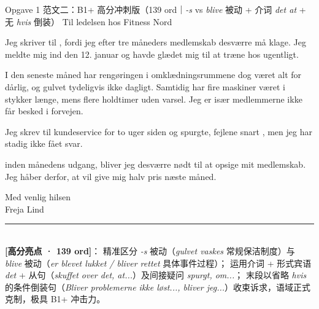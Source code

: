 \begin{emailbox}{Opgave 1 范文二：B1+ 高分冲刺版（139 ord｜\textit{-s} vs \textit{blive} 被动 + 介词 \textit{det at} + 无 \textit{hvis} 倒装）}
Til ledelsen hos Fitness Nord

\vspace{0.25em}
Jeg skriver til , fordi jeg efter tre måneders medlemskab desværre må klage. Jeg meldte mig ind den 12. januar og havde glædet mig til at træne hos  ugentligt.

\vspace{0.25em}
I den seneste måned har rengøringen i omklædningsrummene dog været alt for dårlig, og gulvet  tydeligvis ikke dagligt. Samtidig har fire maskiner været i stykker længe, mens flere holdtimer  uden varsel. Jeg er især  medlemmerne ikke får besked i forvejen.

\vspace{0.25em}
Jeg skrev til  kundeservice for to uger siden og spurgte,  fejlene snart , men jeg har stadig ikke fået svar.

\vspace{0.25em}
 inden månedens udgang, bliver jeg desværre nødt til at opsige mit medlemskab. Jeg håber derfor, at  vil give mig halv pris næste måned.

\vspace{0.25em}
Med venlig hilsen\\
Freja Lind

\vspace{0.3em}
\rule{\linewidth}{0.4pt}\\[0.2em]
\small\textbf{\color{NCDNavy}[高分亮点 · 139 ord]}： 精准区分 \textit{-s} 被动（\textit{gulvet vaskes} 常规保洁制度）与 \textit{blive} 被动（\textit{er blevet lukket / bliver rettet} 具体事件过程）； 运用介词 + 形式宾语 \textit{det} + 从句（\textit{skuffet over det, at...}）及间接疑问 \textit{spurgt, om...}； 末段以省略 \textit{hvis} 的条件倒装句（\textit{Bliver problemerne ikke løst..., bliver jeg...}）收束诉求，语域正式克制，极具 B1+ 冲击力。
\end{emailbox}

